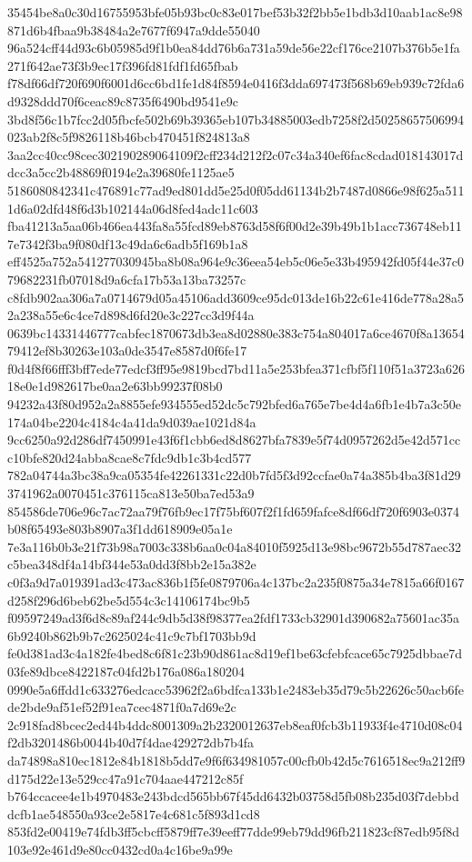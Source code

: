 \documentclass[11pt,a4paper]{article}
\begin{document}
{35454be8a0c30d16755953bfe05b93bc0c83e017bef53b32f2bb5e1bdb3d10aab1ac8e98871d6b4fbaa9b38484a2e7677f6947a9dde55040
96a524cff44d93c6b05985d9f1b0ea84dd76b6a731a59de56e22cf176ce2107b376b5e1fa271f642ae73f3b9ec17f396fd81fdf1fd65fbab
f78df66df720f690f6001d6cc6bd1fe1d84f8594e0416f3dda697473f568b69eb939c72fda6d9328ddd70f6ceac89c8735f6490bd9541e9c
3bd8f56c1b7fcc2d05fbcfe502b69b39365eb107b34885003edb7258f2d50258657506994023ab2f8c5f9826118b46bcb470451f824813a8
3aa2cc40cc98cec302190289064109f2cff234d212f2c07c34a340ef6fac8cdad018143017ddcc3a5cc2b48869f0194e2a39680fe1125ae5
5186080842341c476891c77ad9ed801dd5e25d0f05dd61134b2b7487d0866e98f625a5111d6a02dfd48f6d3b102144a06d8fed4adc11c603
fba41213a5aa06b466ea443fa8a55fcd89eb8763d58f6f00d2e39b49b1b1acc736748eb117e7342f3ba9f080df13c49da6c6adb5f169b1a8
eff4525a752a541277030945ba8b08a964e9c36eea54eb5c06e5e33b495942fd05f44e37c079682231fb07018d9a6cfa17b53a13ba73257c
c8fdb902aa306a7a0714679d05a45106add3609ce95dc013de16b22c61e416de778a28a52a238a55e6c4ce7d898d6fd20e3c227cc3d9f44a
0639bc14331446777cabfec1870673db3ea8d02880e383c754a804017a6ce4670f8a1365479412ef8b30263e103a0de3547e8587d0f6fe17
f0d4f8f66fff3bff7ede77edcf3ff95e9819bcd7bd11a5e253bfea371cfbf5f110f51a3723a62618e0e1d982617be0aa2e63bb99237f08b0
94232a43f80d952a2a8855efe934555ed52dc5c792bfed6a765e7be4d4a6fb1e4b7a3c50e174a04be2204c4184c4a41da9d039ae1021d84a
9cc6250a92d286df7450991e43f6f1cbb6ed8d8627bfa7839e5f74d0957262d5e42d571ccc10bfe820d24abba8cae8c7fdc9db1c3b4cd577
782a04744a3bc38a9ca05354fe42261331c22d0b7fd5f3d92ccfae0a74a385b4ba3f81d293741962a0070451c376115ca813e50ba7ed53a9
854586de706e96c7ac72aa79f76fb9ec17f75bf607f2f1fd659fafce8df66df720f6903e0374b08f65493e803b8907a3f1dd618909e05a1e
7e3a116b0b3e21f73b98a7003c338b6aa0c04a84010f5925d13e98bc9672b55d787aec32c5bea348df4a14bf344e53a0dd3f8bb2e15a382e
c0f3a9d7a019391ad3c473ac836b1f5fe0879706a4c137bc2a235f0875a34e7815a66f0167d258f296d6beb62be5d554c3c14106174bc9b5
f09597249ad3f6d8c89af244c9db5d38f98377ea2fdf1733cb32901d390682a75601ac35a6b9240b862b9b7c2625024c41c9c7bf1703bb9d
fe0d381ad3c4a182fe4bed8c6f81c23b90d861ac8d19ef1be63cfebfcace65c7925dbbae7d03fe89dbce8422187c04fd2b176a086a180204
0990e5a6ffdd1c633276edcacc53962f2a6bdfca133b1e2483eb35d79c5b22626c50acb6fede2bde9af51ef52f91ea7cec4871f0a7d69e2c
2c918fad8bcec2ed44b4ddc8001309a2b2320012637eb8eaf0fcb3b11933f4e4710d08c04f2db3201486b0044b40d7f4dae429272db7b4fa
da74898a810ec1812e84b1818b5dd7e9f6f634981057c00cfb0b42d5c7616518ec9a212ff9d175d22e13e529cc47a91c704aae447212c85f
b764ccacee4e1b4970483e243bdcd565bb67f45dd6432b03758d5fb08b235d03f7debbddcfb1ae548550a93ce2e5817e4c681c5f893d1cd8
853fd2e00419e74fdb3ff5cbcff5879ff7e39eeff77dde99eb79dd96fb211823cf87edb95f8d103e92e461d9e80cc0432cd0a4c16be9a99e
}
\end{document}
